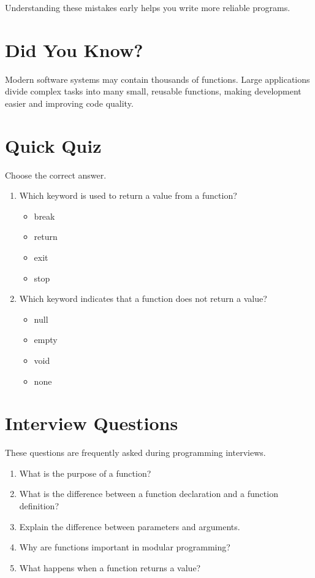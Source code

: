 \documentclass[12pt,openany]{book}
\begin{document}
Understanding these mistakes early helps you write more reliable programs.

\section{Did You Know?}

Modern software systems may contain thousands of functions. Large applications divide complex tasks into many small, reusable functions, making development easier and improving code quality.

\section{Quick Quiz}

Choose the correct answer.

\begin{enumerate}
    \item Which keyword is used to return a value from a function?
    \begin{itemize}
        \item break
        \item return
        \item exit
        \item stop
    \end{itemize}

    \item Which keyword indicates that a function does not return a value?
    \begin{itemize}
        \item null
        \item empty
        \item void
        \item none
    \end{itemize}
\end{enumerate}

\section{Interview Questions}

These questions are frequently asked during programming interviews.

\begin{enumerate}
    \item What is the purpose of a function?
    \item What is the difference between a function declaration and a function definition?
    \item Explain the difference between parameters and arguments.
    \item Why are functions important in modular programming?
    \item What happens when a function returns a value?
\end{enumerate}
\end{document}
